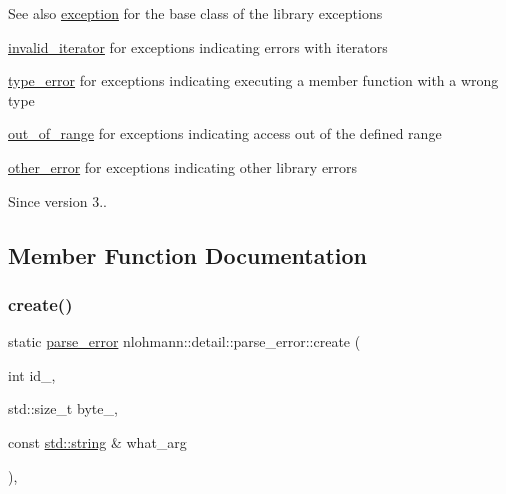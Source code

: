 \begin{DoxySeeAlso}{See also}
\hyperlink{classnlohmann_1_1detail_1_1exception}{exception} for the base class of the library exceptions 

\hyperlink{classnlohmann_1_1detail_1_1invalid__iterator}{invalid\+\_\+iterator} for exceptions indicating errors with iterators 

\hyperlink{classnlohmann_1_1detail_1_1type__error}{type\+\_\+error} for exceptions indicating executing a member function with a wrong type 

\hyperlink{classnlohmann_1_1detail_1_1out__of__range}{out\+\_\+of\+\_\+range} for exceptions indicating access out of the defined range 

\hyperlink{classnlohmann_1_1detail_1_1other__error}{other\+\_\+error} for exceptions indicating other library errors
\end{DoxySeeAlso}
\begin{DoxySince}{Since}
version 3.. 
\end{DoxySince}


\subsection{Member Function Documentation}
\mbox{\label{classnlohmann_1_1detail_1_1parse__error_a9fd60ad6bce80fd99686ad332faefd37}} 
\subsubsection{\texorpdfstring{create()}{create()}}
{\footnotesize\ttfamily static \hyperlink{classnlohmann_1_1detail_1_1parse__error}{parse\+\_\+error} nlohmann\+::detail\+::parse\+\_\+error\+::create (\begin{DoxyParamCaption}\item[{int}]{id\+\_\+,  }\item[{std\+::size\+\_\+t}]{byte\+\_\+,  }\item[{const \hyperlink{namespacenlohmann_1_1detail_a90aa5ef615aa8305e9ea20d8a947980fab45cffe084dd3d20d928bee85e7b0f21}{std\+::string} \&}]{what\+\_\+arg }\end{DoxyParamCaption})\hspace{0.3cm}{\ttfamily [inline]}, {\ttfamily [static]}}



